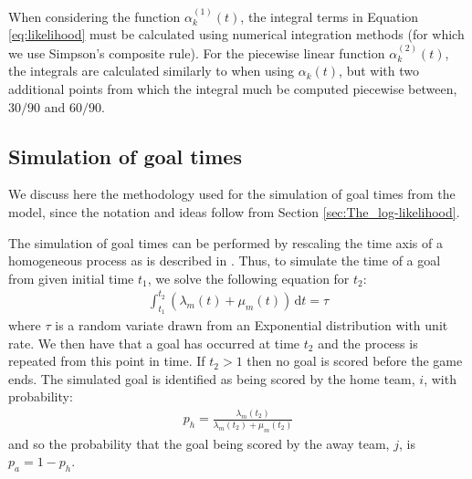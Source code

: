 When considering the function \(\alpha^{(1)}_k(t)\), the integral terms in Equation \eqref{eq:likelihood} must be
calculated using numerical integration methods (for which we use Simpson's composite rule). For the piecewise linear
function \(\alpha^{(2)}_k(t)\), the integrals are calculated similarly to when using \(\alpha_k(t)\), but with two
additional points from which the integral much be computed piecewise between, \(30/90\) and \(60/90\).

\subsection{Simulation of goal times}
\label{sec:Simulation_of_goal_times}

We discuss here the methodology used for the simulation of goal times from the model, since the notation and ideas
follow from Section \ref{sec:The_log-likelihood}. 

The simulation of goal times can be performed by rescaling the time axis of a homogeneous process as is described in
\cite{lewis1979, cinlar2013}. Thus, to simulate the time of a goal from given initial time \(t_1\), we solve the
following equation for \(t_2\):
\begin{align}
\label{eq:simulationIntegral}
\int_{t_1}^{t_2} (\lambda_m(t) + \mu_m(t)) \, \mathrm{d}t = \tau
\end{align}
where \(\tau\) is a random variate drawn from an Exponential distribution with unit rate. We then have that a goal has
occurred at time \(t_2\) and the process is repeated from this point in time. If \(t_2 > 1\) then no goal is scored
before the game ends. The simulated goal is identified as being scored by the home team, \(i\), with probability:
\begin{align}
p_h = \frac{\lambda_m(t_2)}{\lambda_m(t_2) + \mu_m(t_2)}
\end{align}
and so the probability that the goal being scored by the away team, \(j\), is \(p_a = 1 - p_h\). 
 
